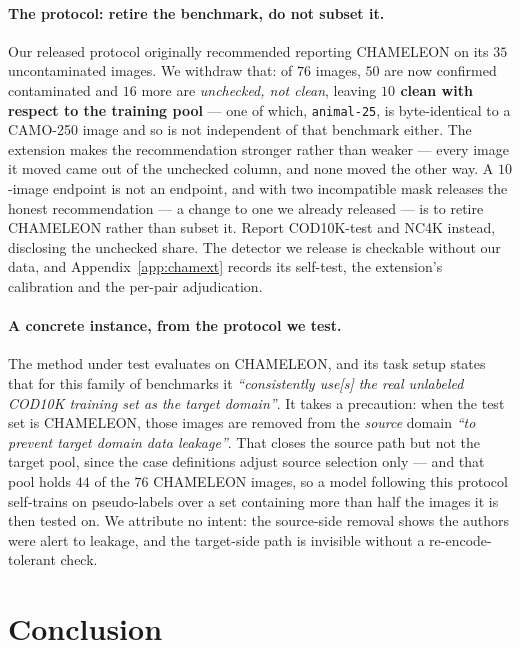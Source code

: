 \documentclass{article} %
\begin{document}
\paragraph{The protocol: retire the benchmark, do not subset it.} Our released protocol originally
recommended reporting CHAMELEON on its $35$ uncontaminated images. We withdraw that: of $76$ images,
$50$ are now confirmed contaminated and $16$ more are \emph{unchecked, not clean}, leaving
\textbf{$10$ clean with respect to the training pool} --- one of which, \texttt{animal-25}, is
byte-identical to a CAMO-250 image and so is not independent of that benchmark either. The extension makes the recommendation stronger rather than
weaker --- every image it moved came out of the unchecked column, and none moved the other way. A
$10$-image endpoint is not an endpoint, and with two incompatible mask releases the honest
recommendation --- a change to one we already released --- is to retire CHAMELEON rather than subset
it. Report COD10K-test and NC4K instead, disclosing the unchecked share. The detector we release is
checkable without our data, and Appendix~\ref{app:chamext} records its self-test, the extension's
calibration and the per-pair adjudication.

\paragraph{A concrete instance, from the protocol we test.} The method under test evaluates on
CHAMELEON, and its task setup states that for this family of benchmarks it \emph{``consistently use[s] the real
unlabeled COD10K training set as the target domain''}. It takes a precaution: when the test set is
CHAMELEON, those images are removed from the \emph{source} domain \emph{``to prevent target domain
data leakage''}. That closes the source path but not the target pool, since the case definitions adjust source
selection only --- and that pool holds $44$ of the $76$ CHAMELEON images, so a model following this
protocol self-trains on pseudo-labels over a set containing more than half the images it is then
tested on. We attribute no intent: the source-side removal shows the authors were alert to leakage,
and the target-side path is invisible without a re-encode-tolerant check.

\section{Conclusion}
\label{sec:conclusion}
\end{document}
